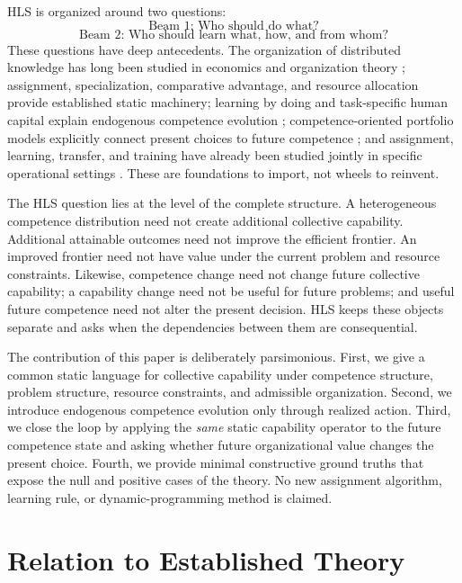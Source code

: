 \documentclass[10pt]{article}
\begin{document}
HLS is organized around two questions:
\begin{equation}
\text{Beam 1: Who should do what?}
\end{equation}
\begin{equation}
\text{Beam 2: Who should learn what, how, and from whom?}
\end{equation}
These questions have deep antecedents. The organization of distributed knowledge has long been studied in economics and organization theory \cite{garicano2000}; assignment, specialization, comparative advantage, and resource allocation provide established static machinery; learning by doing and task-specific human capital explain endogenous competence evolution \cite{arrow1962,gibbonswaldman2004,argotemiron2011}; competence-oriented portfolio models explicitly connect present choices to future competence \cite{gutjahr2011,gutjahretal2010multiobjective}; and assignment, learning, transfer, and training have already been studied jointly in specific operational settings \cite{nembhardbentefouet2015,borgonjon2024dynamic}. These are foundations to import, not wheels to reinvent.

The HLS question lies at the level of the complete structure. A heterogeneous competence distribution need not create additional collective capability. Additional attainable outcomes need not improve the efficient frontier. An improved frontier need not have value under the current problem and resource constraints. Likewise, competence change need not change future collective capability; a capability change need not be useful for future problems; and useful future competence need not alter the present decision. HLS keeps these objects separate and asks when the dependencies between them are consequential.

The contribution of this paper is deliberately parsimonious. First, we give a common static language for collective capability under competence structure, problem structure, resource constraints, and admissible organization. Second, we introduce endogenous competence evolution only through realized action. Third, we close the loop by applying the \emph{same} static capability operator to the future competence state and asking whether future organizational value changes the present choice. Fourth, we provide minimal constructive ground truths that expose the null and positive cases of the theory. No new assignment algorithm, learning rule, or dynamic-programming method is claimed.

\section{Relation to Established Theory}
\end{document}

